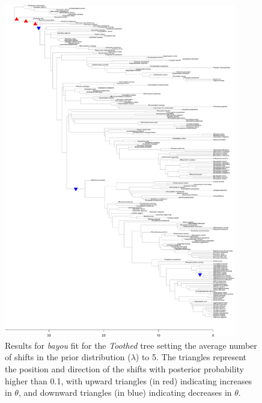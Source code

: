 \begin{figure}[H]
\includegraphics[width=0.9\textwidth]{img/plots-toothed-wZBL-k5-1.pdf}
\caption{Results for \textit{bayou} fit for the \textit{Toothed} tree setting the average number of shifts in the prior distribution ($\lambda$) to 5. The triangles represent the position and direction of the shifts with posterior probability higher than 0.1, with upward triangles (in red) indicating increases in $\theta$, and downward triangles (in blue) indicating decreases in $\theta$.}
\label{fig:toothed-k5}
\end{figure}

\newpage

